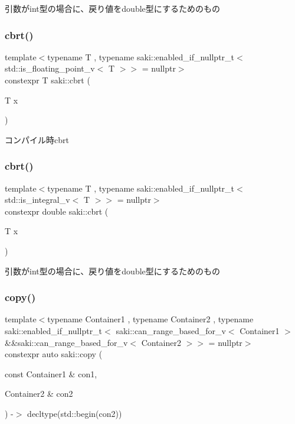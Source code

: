 引数がint型の場合に、戻り値をdouble型にするためのもの 

\mbox{\label{namespacesaki_a8836c929b71a61cf0151d3b76eb7af15}} 
\subsubsection{\texorpdfstring{cbrt()}{cbrt()}\hspace{0.1cm}{\footnotesize\ttfamily [1/2]}}
{\footnotesize\ttfamily template$<$typename T , typename saki\+::enabled\+\_\+if\+\_\+nullptr\+\_\+t$<$ std\+::is\+\_\+floating\+\_\+point\+\_\+v$<$ T $>$$>$  = nullptr$>$ \\
constexpr T saki\+::cbrt (\begin{DoxyParamCaption}\item[{T}]{x }\end{DoxyParamCaption})}



コンパイル時cbrt 

\mbox{\label{namespacesaki_a5a3d1ab0508dcff1fb2e17a4ef8a855d}} 
\subsubsection{\texorpdfstring{cbrt()}{cbrt()}\hspace{0.1cm}{\footnotesize\ttfamily [2/2]}}
{\footnotesize\ttfamily template$<$typename T , typename saki\+::enabled\+\_\+if\+\_\+nullptr\+\_\+t$<$ std\+::is\+\_\+integral\+\_\+v$<$ T $>$$>$  = nullptr$>$ \\
constexpr double saki\+::cbrt (\begin{DoxyParamCaption}\item[{T}]{x }\end{DoxyParamCaption})}



引数がint型の場合に、戻り値をdouble型にするためのもの 

\mbox{\label{namespacesaki_a3a9c67bf73207dfb61db4cd53ee35863}} 
\subsubsection{\texorpdfstring{copy()}{copy()}}
{\footnotesize\ttfamily template$<$typename Container1 , typename Container2 , typename saki\+::enabled\+\_\+if\+\_\+nullptr\+\_\+t$<$ saki\+::can\+\_\+range\+\_\+based\+\_\+for\+\_\+v$<$ Container1 $>$ \&\&saki\+::can\+\_\+range\+\_\+based\+\_\+for\+\_\+v$<$ Container2 $>$$>$  = nullptr$>$ \\
constexpr auto saki\+::copy (\begin{DoxyParamCaption}\item[{const Container1 \&}]{con1,  }\item[{Container2 \&}]{con2 }\end{DoxyParamCaption}) -\/$>$ decltype(std\+::begin(con2))
	}



